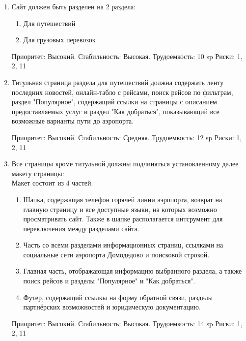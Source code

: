 
\begin{enumerate}
      \item Сайт должен быть разделен на 2 раздела:
            \begin{enumerate}
                  \item Для путешествий
                  \item Для грузовых перевозок
            \end{enumerate}
            Приоритет: Высокий. Стабильность: Высокая. Трудоемкость: 10 sp
            Риски: 1, 2, 11

      \item Титульная страница раздела для путешествий
            должна содержать ленту последних новостей,
            онлайн-табло с рейсами, поиск рейсов по фильтрам,
            раздел "Популярное", содержащий ссылки на
            страницы с описанием предоставляемых услуг и
            раздел "Как добраться", показывающий все
            возможные варианты пути до аэропорта.
            
            Приоритет: Высокий. Стабильность: Средняя. Трудоемкость: 12 sp
            Риски: 1, 2, 11


      \item Все страницы кроме титульной должны подчиняться
            установленному далее макету страницы: \\
            Макет состоит из 4 частей:

            \begin{enumerate}
                  \item Шапка, содержащая телефон горячей линии
                        аэропорта, возврат на главную страницу и все
                        доступные языки, на которых возможно
                        просматривать сайт. Также в шапке располагается
                        интсрумент для переключения между разделами
                        сайта.

                  \item Часть со всеми разделами информационных
                        страниц, ссылками на социальные сети аэропорта
                        Домодедово и поисковой строкой.

                  \item Главная часть, отображающая информацию
                        выбранного раздела, а также поиск рейсов и разделы
                        "Популярное" и "Как добраться".

                  \item Футер, содержащий ссылкы на форму обратной
                        связи, разделы партнёрских возможностей и
                        юридическую документацию.
            \end{enumerate}

            Приоритет: Высокий. Стабильность: Высокая. Трудоемкость: 14 sp
            Риски: 1, 2, 11

\end{enumerate}
